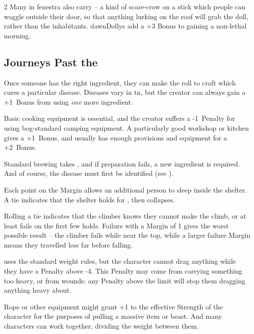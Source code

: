\begin{multicols}{2}
Many in \gls{fenestra} also carry  -- a kind of scare-crow on a stick which people can waggle outside their door, so that anything lurking on the roof will grab the doll, rather than the inhabitants.
\Glspl{dawnDolly} add a +3 Bonus to gaining a non-lethal morning.

\subsection{Journeys Past the }

%
Once someone has the right \gls{ingredient}, they can make the roll to craft  which cures a particular disease.
Diseases vary in \gls{tn}, but the creator can always gain a +1~Bonus from using \emph{one} more \gls{ingredient}.

Basic cooking equipment is essential, and the creator suffers a -1~Penalty for using bog-standard camping equipment.
A particularly good workshop or kitchen gives a +1~Bonus, and  usually has enough provisions and equipment for a +2~Bonus.

Standard brewing takes , and if preparation fails, a new \gls{ingredient} is required.
And of course, the disease must first be identified (see ).

Each point on the Margin allows an additional person to sleep inside the shelter.
A tie indicates that the shelter holds for , then collapses.

Rolling a tie indicates that the climber knows they cannot make the climb, or at least fails on the first few holds.
Failure with a Margin of 1 gives the worst possible result -- the climber fails while near the top, while a larger failure Margin means they travelled less far before falling.

uses the standard \gls{weight} rules, but the character cannot drag anything while they have a Penalty above -4.
This Penalty may come from carrying something too heavy, or from wounds; any Penalty above the limit will stop them dragging anything heavy about.

Rope or other equipment might grant +1 to the effective Strength of the character for the purposes of pulling a massive item or beast.
And many characters can work together, dividing the \gls{weight} between them.


\end{multicols}
